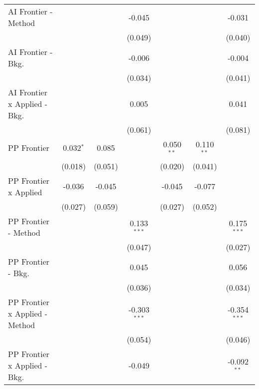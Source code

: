 \begin{tabular}{lcccccc}
   AI Frontier - Method           &             &         & -0.045         &              &               & -0.031\\   
                                  &             &         & (0.049)        &              &               & (0.040)\\   
   AI Frontier - Bkg.             &             &         & -0.006         &              &               & -0.004\\   
                                  &             &         & (0.034)        &              &               & (0.041)\\   
   AI Frontier x Applied - Bkg.   &             &         & 0.005          &              &               & 0.041\\   
                                  &             &         & (0.061)        &              &               & (0.081)\\   
   PP Frontier                    & 0.032$^{*}$ & 0.085   &                & 0.050$^{**}$ & 0.110$^{**}$  &   \\   
                                  & (0.018)     & (0.051) &                & (0.020)      & (0.041)       &   \\   
   PP Frontier x Applied          & -0.036      & -0.045  &                & -0.045       & -0.077        &   \\   
                                  & (0.027)     & (0.059) &                & (0.027)      & (0.052)       &   \\   
   PP Frontier - Method           &             &         & 0.133$^{***}$  &              &               & 0.175$^{***}$\\   
                                  &             &         & (0.047)        &              &               & (0.027)\\   
   PP Frontier - Bkg.             &             &         & 0.045          &              &               & 0.056\\   
                                  &             &         & (0.036)        &              &               & (0.034)\\   
   PP Frontier x Applied - Method &             &         & -0.303$^{***}$ &              &               & -0.354$^{***}$\\   
                                  &             &         & (0.054)        &              &               & (0.046)\\   
   PP Frontier x Applied - Bkg.   &             &         & -0.049         &              &               & -0.092$^{**}$\\   

\end{tabular}
